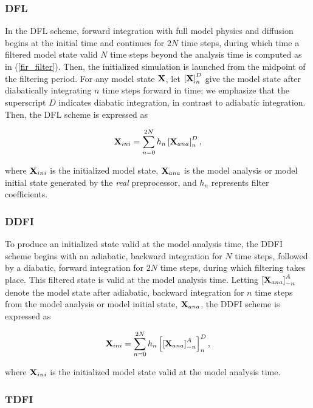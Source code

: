 \subsubsection{DFL}

In the DFL scheme, forward integration with full model physics and diffusion 
begins at the initial time and continues for $2N$ time steps, during which 
time a filtered model state valid $N$ time steps beyond the analysis time is 
computed as in (\ref{fir_filter}). Then, the initialized simulation is 
launched from the midpoint of the filtering period. For any model state ${\bf X}$, 
let $\left[ {\bf X} \right]_n^D$ give the model state after diabatically 
integrating $n$ time steps forward in time; we emphasize that the superscript 
$D$ indicates diabatic integration, in contrast to adiabatic integration. 
Then, the DFL scheme is expressed as

\begin{equation}
{\bf X}_{ini} = \sum_{n=0}^{2N} h_n \left[ {\bf X}_{ana} \right]_n^D,
\end{equation}

\noindent
where ${\bf X}_{ini}$ is the initialized model state, ${\bf X}_{ana}$ is the 
model analysis or model initial state generated by the {\it real} preprocessor, 
and $h_n$ represents filter coefficients.

\subsubsection{DDFI}

To produce an initialized state valid at the model analysis time, the DDFI 
scheme begins with an adiabatic, backward integration for $N$ time steps, 
followed by a diabatic, forward integration for $2N$ time steps, during which 
filtering takes place. This filtered state is valid at the model analysis time. 
Letting $\left[ {\bf X}_{ana} \right]_{-n}^A$ denote the model state after 
adiabatic, backward integration for $n$ time steps from the model analysis or 
model initial state, ${\bf X}_{ana}$, the DDFI scheme is expressed as

\begin{equation}
{\bf X}_{ini} = \sum_{n=0}^{2N} h_n \left[    \left[ {\bf X}_{ana} \right]_{-n}^A   \right]_n^D,
\end{equation}

\noindent
where ${\bf X}_{ini}$ is the initialized model state valid at the model analysis time.

\subsubsection{TDFI}

